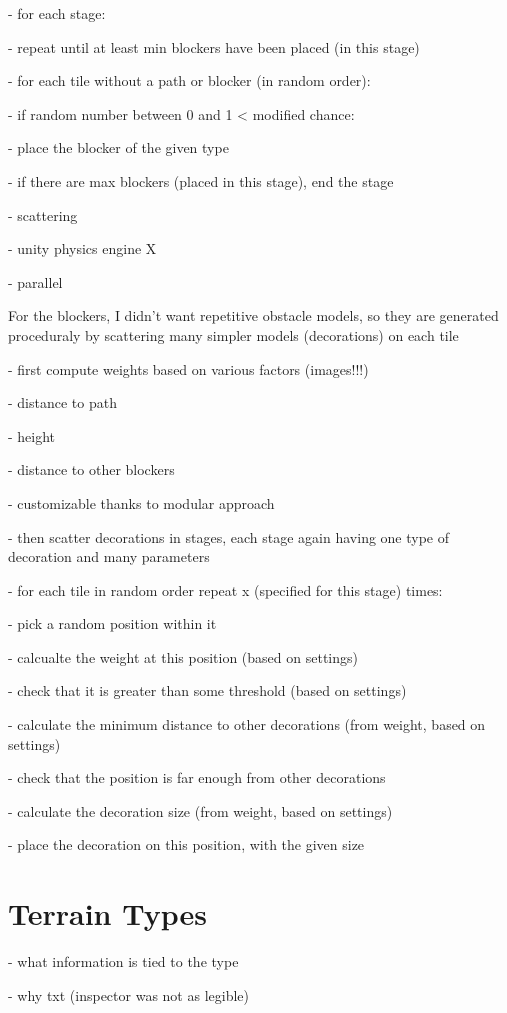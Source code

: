 - for each stage:

- repeat until at least min blockers have been placed (in this stage)

- for each tile without a path or blocker (in random order):

- if random number between 0 and 1 < modified chance:

- place the blocker of the given type

- if there are max blockers (placed in this stage), end the stage

- scattering

- unity physics engine X

- parallel

For the blockers, I didn't want repetitive obstacle models, so they are generated proceduraly by scattering many simpler models (decorations) on each tile

- first compute weights based on various factors (images!!!)

- distance to path

- height

- distance to other blockers

- customizable thanks to modular approach

- then scatter decorations in stages, each stage again having one type of decoration and many parameters

- for each tile in random order repeat x (specified for this stage) times:

- pick a random position within it

- calcualte the weight at this position (based on settings)

- check that it is greater than some threshold (based on settings)

- calculate the minimum distance to other decorations (from weight, based on settings)

- check that the position is far enough from other decorations

- calculate the decoration size (from weight, based on settings)

- place the decoration on this position, with the given size

\section{Terrain Types}

- what information is tied to the type

- why txt (inspector was not as legible)

